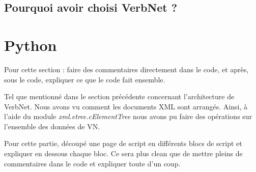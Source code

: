 \subsection{Pourquoi avoir choisi VerbNet ?}




\section{Python}

Pour cette section : faire des commentaires directement dans le code, et après, sous le code, expliquer ce que le code fait ensemble.

Tel que mentionné dans le section précédente concernant l'architecture de VerbNet. Nous avons vu comment les documents XML sont  arrangés. Ainsi, à l'aide du module \emph{xml.etree.cElementTree} nous avons pu faire des opérations sur l'ensemble des données de VN.

Pour cette partie, découpé une page de script en différents blocs de script et expliquer en dessous chaque bloc. Ce sera plus clean que de mettre pleins de commentaires dans le code et expliquer toute d'un coup.

